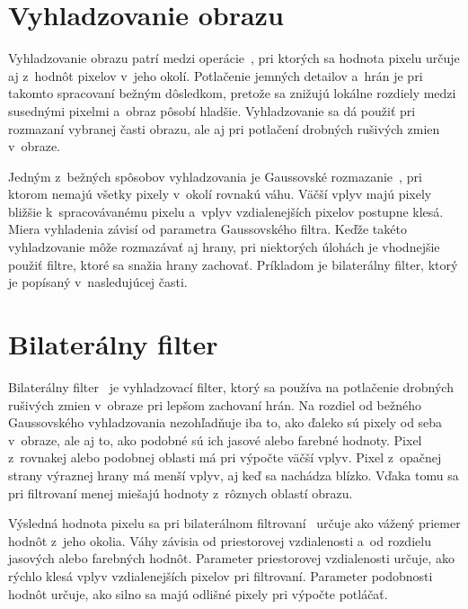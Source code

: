 \section{Vyhladzovanie obrazu}
\label{sec:filter_blur}

Vyhladzovanie obrazu patrí medzi operácie~\cite{hiprmean}, pri ktorých sa hodnota pixelu určuje aj z~hodnôt pixelov v~jeho okolí. Potlačenie jemných detailov a~hrán je pri takomto spracovaní bežným dôsledkom, pretože sa znižujú lokálne rozdiely medzi susednými pixelmi a~obraz pôsobí hladšie. Vyhladzovanie sa dá použiť pri rozmazaní vybranej časti obrazu, ale aj pri potlačení drobných rušivých zmien v~obraze.

Jedným z~bežných spôsobov vyhladzovania je Gaussovské rozmazanie~\cite{hiprgaussian}, pri ktorom nemajú všetky pixely v~okolí rovnakú váhu. Väčší vplyv majú pixely bližšie k~spracovávanému pixelu a~vplyv vzdialenejších pixelov postupne klesá. Miera vyhladenia závisí od parametra Gaussovského filtra. Keďže takéto vyhladzovanie môže rozmazávať aj hrany, pri niektorých úlohách je vhodnejšie použiť filtre, ktoré sa snažia hrany zachovať. Príkladom je bilaterálny filter, ktorý je popísaný v~nasledujúcej časti.

\section{Bilaterálny filter}
\label{sec:bilateral}

Bilaterálny filter~\cite{tomasi} je vyhladzovací filter, ktorý sa používa na potlačenie drobných rušivých zmien v~obraze pri lepšom zachovaní hrán. Na rozdiel od bežného Gaussovského vyhladzovania nezohľadňuje iba to, ako ďaleko sú pixely od seba v~obraze, ale aj to, ako podobné sú ich jasové alebo farebné hodnoty. Pixel z~rovnakej alebo podobnej oblasti má pri výpočte väčší vplyv. Pixel z~opačnej strany výraznej hrany má menší vplyv, aj keď sa nachádza blízko. Vďaka tomu sa pri filtrovaní menej miešajú hodnoty z~rôznych oblastí obrazu.

Výsledná hodnota pixelu sa pri bilaterálnom filtrovaní~\cite{tomasi} určuje ako vážený priemer hodnôt z~jeho okolia. Váhy závisia od priestorovej vzdialenosti a~od rozdielu jasových alebo farebných hodnôt. Parameter priestorovej vzdialenosti určuje, ako rýchlo klesá vplyv vzdialenejších pixelov pri filtrovaní. Parameter podobnosti hodnôt určuje, ako silno sa majú odlišné pixely pri výpočte potláčať.

